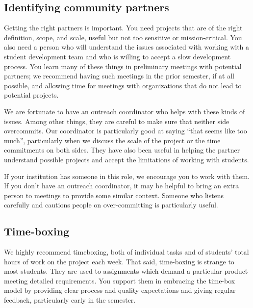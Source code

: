 \subsection{Identifying community partners}

Getting the right partners is important.  You need projects that
are of the right definition, scope, and scale, useful but not too sensitive 
or mission-critical.
You also need a person who will understand
the issues associated with working with a student development team and
who is willing to accept a slow development process.  You learn many of
these things in preliminary meetings with potential partners; we recommend
having such meetings in the prior semester, if at all possible, and allowing 
time for meetings with organizations that do not lead to potential projects.

We are fortunate to have an outreach coordinator who helps with these kinds
of issues.  Among other things, they are careful to make sure that neither
side overcommits.  Our coordinator is particularly good at saying ``that
seems like too much'', particularly when we discuss the scale of the project
or the time commitments on both sides.  They have also been useful in
helping the partner understand possible projects and accept the limitations
of working with students.

If your institution has someone in this role, we encourage you to work with
them.  If you don't have an outreach coordinator, it may be helpful to
bring an extra person to meetings to provide some similar context.  Someone
who listens carefully and cautions people on over-committing is particularly
useful.

\subsection{Time-boxing}

We highly recommend timeboxing, both of individual tasks and of students' 
total hours of work on the project each week.
%
That said, 
time-boxing is strange to most students.  They are used to assignments 
which demand a particular
product meeting detailed requirements.  You support them in embracing the
time-box model by providing clear process and quality expectations and
giving regular feedback, particularly early in the semester.

